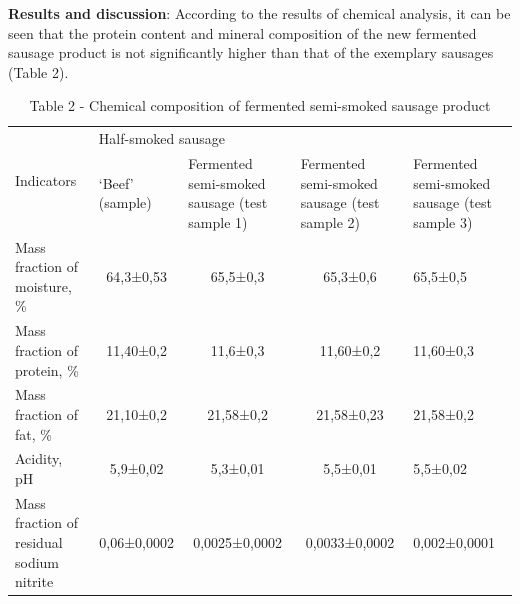 {\bfseries Results and discussion}: According to the results of chemical
analysis, it can be seen that the protein content and mineral
composition of the new fermented sausage product is not significantly
higher than that of the exemplary sausages (Table 2).

\begin{table}[H]
\caption*{Table 2 - Chemical composition of fermented semi-smoked sausage product}
\centering
\begin{tabular}{|l|llll|}
\hline
\multirow{2}{*}{Indicators}              & \multicolumn{4}{l|}{Half-smoked sausage}                                                                                                                                                                                       \\ \cline{2-5} 
                                         & \multicolumn{1}{l|}{‘Beef’ (sample)} & \multicolumn{1}{p{0.15\textwidth}|}{Fermented semi-smoked sausage (test sample 1)} & \multicolumn{1}{p{0.15\textwidth}|}{Fermented semi-smoked sausage (test sample 2)} & \multicolumn{1}{p{0.15\textwidth}|}{Fermented semi-smoked sausage (test sample 3)} \\ \hline
Mass fraction of moisture, \%            & \multicolumn{1}{c|}{64,3±0,53}       & \multicolumn{1}{c|}{65,5±0,3}                                      & \multicolumn{1}{c|}{65,3±0,6}                                      & 65,5±0,5                                      \\ \hline
Mass fraction of protein, \%             & \multicolumn{1}{c|}{11,40±0,2}       & \multicolumn{1}{c|}{11,6±0,3}                                      & \multicolumn{1}{c|}{11,60±0,2}                                     & 11,60±0,3                                     \\ \hline
Mass fraction of fat, \%                 & \multicolumn{1}{c|}{21,10±0,2}       & \multicolumn{1}{c|}{21,58±0,2}                                     & \multicolumn{1}{c|}{21,58±0,23}                                    & 21,58±0,2                                     \\ \hline
Acidity, pH                              & \multicolumn{1}{c|}{5,9±0,02}        & \multicolumn{1}{c|}{5,3±0,01}                                      & \multicolumn{1}{c|}{5,5±0,01}                                      & 5,5±0,02                                      \\ \hline
\multicolumn{1}{|p{0.25\textwidth}|}{Mass fraction of residual sodium nitrite} & \multicolumn{1}{c|}{0,06±0,0002}     & \multicolumn{1}{c|}{0,0025±0,0002}                                 & \multicolumn{1}{c|}{0,0033±0,0002}                                 & 0,002±0,0001                                  \\ \hline
\end{tabular}
\end{table}


